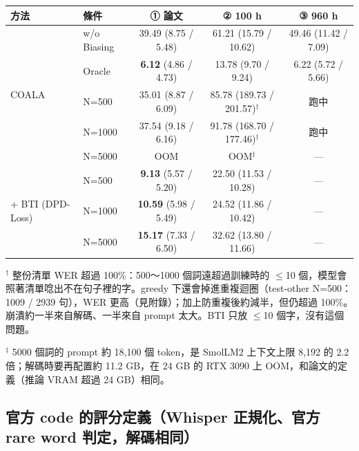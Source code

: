 \documentclass[11pt,a4paper]{article}
\newcommand{\todo}{---}                 %
\newcommand{\running}{跑中}
\begin{document}
\begin{center}
{\small
\begin{tabular}{llccc}
\toprule
\textbf{方法} & \textbf{條件} & \textbf{① 論文} & \textbf{② 100 h} & \textbf{③ 960 h} \\
\midrule
\multirow{5}{*}{COALA}
 & w/o Biasing & 39.49 (8.75 / 5.48) & 61.21 (15.79 / 10.62) & 49.46 (11.42 / 7.09) \\
 & Oracle      & \textbf{6.12} (4.86 / 4.73) & 13.78 (9.70 / 9.24) & 6.22 (5.72 / 5.66) \\
 & N=500       & 35.01 (8.87 / 6.09) & 85.78 (189.73 / 201.57)$^\dagger$ & \running \\
 & N=1000      & 37.54 (9.18 / 6.16) & 91.78 (168.70 / 177.46)$^\dagger$ & \running \\
 & N=5000      & OOM & OOM$^\ddagger$ & \todo \\
\midrule
\multirow{3}{*}{+ BTI (DPD-Loss)}
 & N=500       & \textbf{9.13} (5.57 / 5.20) & 22.50 (11.53 / 10.28) & \todo \\
 & N=1000      & \textbf{10.59} (5.98 / 5.49) & 24.52 (11.86 / 10.42) & \todo \\
 & N=5000      & \textbf{15.17} (7.33 / 6.50) & 32.62 (13.80 / 11.66) & \todo \\
\bottomrule
\end{tabular}
}
\end{center}

{\small
$^\dagger$ 整份清單 WER 超過 100\%：500～1000 個詞遠超過訓練時的 $\le$10 個，模型會照著清單唸出不在句子裡的字。greedy 下還會掉進重複迴圈（test-other N=500：1009 / 2939 句），WER 更高（見附錄）；加上防重複後約減半，但仍超過 100\%。崩潰約一半來自解碼、一半來自 prompt 太大。BTI 只放 $\le$10 個字，沒有這個問題。

$^\ddagger$ 5000 個詞的 prompt 約 18,100 個 token，是 SmolLM2 上下文上限 8,192 的 2.2 倍；解碼時要再配置約 11.2 GB，在 24 GB 的 RTX 3090 上 OOM，和論文的定義（推論 VRAM 超過 24 GB）相同。\par}

\subsection*{官方 code 的評分定義（Whisper 正規化、官方 rare word 判定，解碼相同）}
\end{document}
